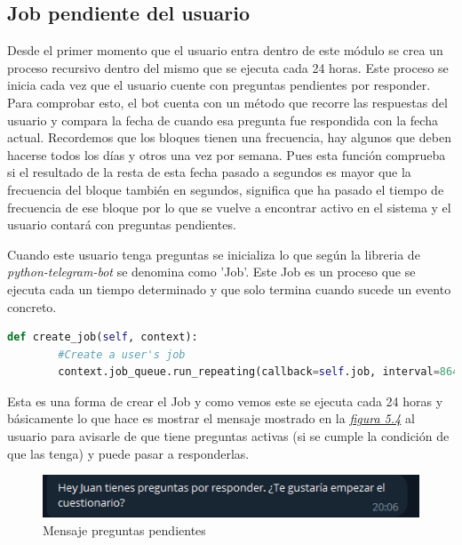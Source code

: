 \subsection{Job pendiente del usuario}

\vspace{0.5cm}

Desde el primer momento que el usuario entra dentro de este módulo se crea un proceso recursivo dentro del mismo que se ejecuta cada 24 horas. Este proceso se inicia cada vez que el usuario cuente con preguntas pendientes por responder. Para comprobar esto, el bot cuenta con un método que recorre las respuestas del usuario y compara la fecha de cuando esa pregunta fue respondida con la fecha actual. Recordemos que los bloques tienen una frecuencia, hay algunos que deben hacerse todos los días y otros una vez por semana. Pues esta función comprueba si el resultado de la resta de esta fecha pasado a segundos es mayor que la frecuencia del bloque también en segundos, significa que ha pasado el tiempo de frecuencia de ese bloque por lo que se vuelve a encontrar activo en el sistema y el usuario contará con preguntas pendientes. 

Cuando este usuario tenga preguntas se inicializa lo que según la libreria de \textit{python-telegram-bot} se denomina como 'Job'. Este Job es un proceso que se ejecuta cada un tiempo determinado y que solo termina cuando sucede un evento concreto. 

\begin{lstlisting}[language=Python]
    def create_job(self, context):
        #Create a user's job
        context.job_queue.run_repeating(callback=self.job, interval=86400, first=0, context=self.suscriber.chatid, name=self.suscriber.chatid)
\end{lstlisting}

Esta es una forma de crear el Job y como vemos este se ejecuta cada 24 horas y básicamente lo que hace es mostrar el mensaje mostrado en la \textit{\hyperref[fig:pending]{figura 5.4}} al usuario para avisarle de que tiene preguntas activas (si se cumple la condición de que las tenga) y puede pasar a responderlas.

\begin{figure}[!ht]
    \centering
    \includegraphics[width=1\textwidth]{imagenes/mensaje_preguntasactivas.png}
    \caption{ Mensaje preguntas pendientes }
    \label{fig:pending}
\end{figure}

